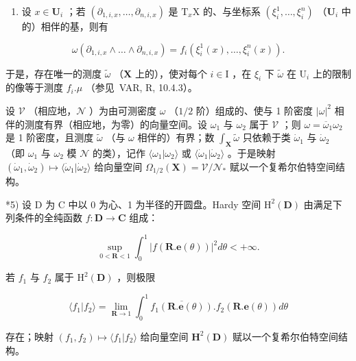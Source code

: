 \begin{enumerate}
\def\labelenumi{\alph{enumi})}
\setcounter{enumi}{1}
\tightlist
\item
  设 \(x \in \mathbf{U}_i\) ；若 \((\partial_{1,i,x}, \ldots, \partial_{n,i,x})\) 是 \(\mathrm{T}_x\mathrm{X}\) 的、与坐标系 \((\xi_i^1, \ldots, \xi_i^n)\) （\(\mathbf{U}_i\) 中的）相伴的基，则有
\end{enumerate}

\[
\omega \left(\partial_ {1, i, x} \wedge \dots \wedge \partial_ {n, i, x}\right) = f _ {i} \left(\xi_ {i} ^ {1} (x), \dots , \xi_ {i} ^ {n} (x)\right).
\]

于是，存在唯一的测度 \(\tilde{\omega}\) （\(\mathbf{X}\) 上的），使对每个 \(i\in \mathrm{I}\) ，在 \(\xi_{i}\) 下 \(\tilde{\omega}\) 在 \(\mathrm{U}_i\) 上的限制的像等于测度 \(f_{i}.\mu\) （参见~VAR, R, 10.4.3）。

设 \(\mathcal{V}\) （相应地，\(\mathcal{N}\) ）为由可测密度 \(\omega\) （\(1/2\) 阶）组成的、使与 1 阶密度 \(|\omega|^2\) 相伴的测度有界（相应地，为零）的向量空间。设 \(\omega_1\) 与 \(\omega_2\) 属于 \(\mathcal{V}\) ；则 \(\omega = \overline{\omega}_1\omega_2\) 是 1 阶密度，且测度 \(\tilde{\omega}\) （与 \(\omega\) 相伴的）有界；数 \(\int_{\mathbf{X}}\tilde{\omega}\) 只依赖于类 \(\dot{\omega}_1\) 与 \(\dot{\omega}_2\) （即 \(\omega_1\) 与 \(\omega_2\) 模 \(\mathcal{N}\) 的类），记作 \(\langle\omega_1|\omega_2\rangle\) 或 \(\langle\dot{\omega}_1|\dot{\omega}_2\rangle\) 。于是映射 \((\dot{\omega}_1,\dot{\omega}_2)\mapsto\langle\dot{\omega}_1|\dot{\omega}_2\rangle\) 给向量空间 \(\Omega_{1/2}(\mathbf{X})=\mathcal{V}/\mathcal{N}_{*}\) 赋以一个复希尔伯特空间结构。

*5) 设 D 为 C 中以 0 为心、1 为半径的开圆盘。Hardy 空间 \(\mathrm{H}^2 (\mathbf{D})\) 由满足下列条件的全纯函数 \(f\colon \mathbf{D}\to \mathbf{C}\) 组成：

\[
\sup _ {0 <   \mathbf {R} <   1} \int_ {0} ^ {1} | f (\mathbf {R}. \mathbf {e} (\theta)) | ^ {2} d \theta <   + \infty .
\]

若 \(f_{1}\) 与 \(f_{2}\) 属于 \(\mathrm{H}^2 (\mathbf{D})\) ，则极限

\[
\langle f _ {1} | f _ {2} \rangle = \lim _ {\mathbf {R} \rightarrow 1} \int_ {0} ^ {1} \overline {{{f _ {1} (\mathbf {R} . \mathbf {e} (\theta))}}}. f _ {2} (\mathbf {R}. \mathbf {e} (\theta)) d \theta
\]

存在；映射 \((f_1, f_2) \mapsto \langle f_1 | f_2 \rangle\) 给向量空间 \(\mathbf{H}^2(\mathbf{D})\) 赋以一个复希尔伯特空间结构。

